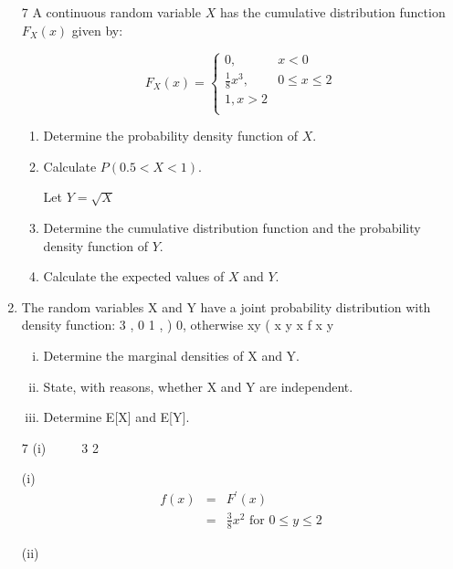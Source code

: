 \documentclass[a4paper,12pt]{article}
\begin{document}
\begin{enumerate}

7 A continuous random variable $X$ has the cumulative distribution function $F_X(x)$ given
by:


\[ F_X(x) = \begin{cases}
0, & x <0 \\
\frac{1}{8}x^3 , & 0 \leq x \leq 2\\
1, x > 2 \\
\end{cases}\]

\begin{enumerate}
\item Determine the probability density function of $X$. 
\item Calculate $P(0.5 <X< 1)$.

Let $Y =  \sqrt{X}$

\item Determine the cumulative distribution function and the probability density
function of $Y$. 
\item Calculate the expected values of $X$ and $Y$. 
\end{enumerate}
\item The random variables X and Y have a joint probability distribution with density
function:
  3 , 0 1
, )
0, otherwise
xy (
  x y x
  f x y
     
  
  
  
\begin{enumerate}[(i)]
\item Determine the marginal densities of X and Y. 
\item State, with reasons, whether X and Y are independent. 
\item Determine E[X] and E[Y]. 
\end{enumerate}
  
  7 (i)     3 2


(i) 
\begin{eqnarray*}
f ( x ) &=& F ^{\prime} ( x ) \\  
&=& \frac{3}{8} x^2 \mbox{ for } 0 \leq y \leq 2
\end{eqnarray*}



(ii) 


\end{enumerate}
\end{document}

